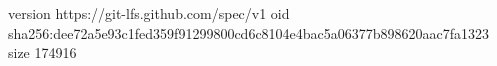 version https://git-lfs.github.com/spec/v1
oid sha256:dee72a5e93c1fed359f91299800cd6c8104e4bac5a06377b898620aac7fa1323
size 174916
